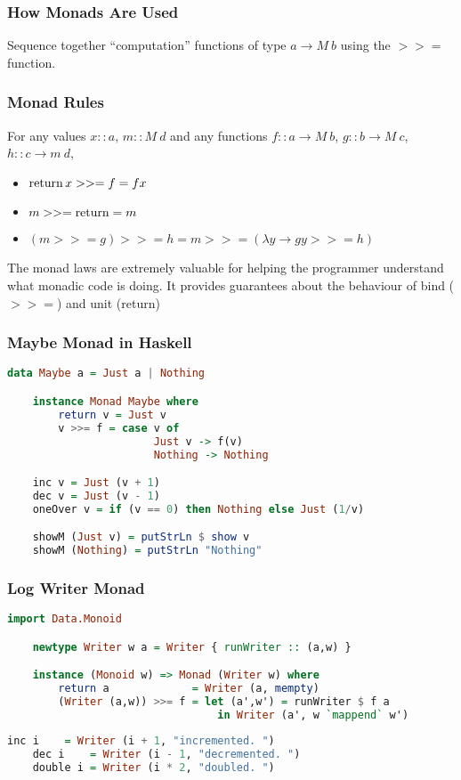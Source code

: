 \documentclass[presentation.tex]{subfiles}
\begin{document}
\begin{frame}
  \frametitle{How Monads Are Used}

  Sequence together ``computation'' functions of type $a \rightarrow
  M\ b$ using the $>>=$ function.
\end{frame}

\begin{frame}
  \frametitle{Monad Rules}
  For any values $x::a$, $m::M\ d$ and any functions $f::a \rightarrow M\ b$, $g::b \rightarrow M\ c$, $h::c \rightarrow m\ d$,
  \begin{itemize}
  \item
    $\operatorname{return} x >>= f = f x$
  \item
    $m >>= \operatorname{return} = m$
  \item
    $(m >>= g) >>= h = m >>= (\lambda y \rightarrow g y >>= h)$
  \end{itemize}

  The monad laws are extremely valuable for helping the programmer
  understand what monadic code is doing. It provides guarantees about
  the behaviour of bind ($>>=$) and unit (return)
\end{frame}


\begin{frame}[fragile]
  \frametitle{Maybe Monad in Haskell}
  \begin{lstlisting}[frame=single,language=Haskell,breaklines=true]
    data Maybe a = Just a | Nothing

    instance Monad Maybe where
        return v = Just v
        v >>= f = case v of
                       Just v -> f(v)
                       Nothing -> Nothing

    inc v = Just (v + 1)
    dec v = Just (v - 1)
    oneOver v = if (v == 0) then Nothing else Just (1/v)

    showM (Just v) = putStrLn $ show v
    showM (Nothing) = putStrLn "Nothing"
  \end{lstlisting}
\end{frame}

\begin{frame}[fragile]
  \frametitle{Log Writer Monad}
  \begin{lstlisting}[frame=single,language=Haskell,breaklines=true]
    import Data.Monoid

    newtype Writer w a = Writer { runWriter :: (a,w) }

    instance (Monoid w) => Monad (Writer w) where
        return a             = Writer (a, mempty)
        (Writer (a,w)) >>= f = let (a',w') = runWriter $ f a
                                 in Writer (a', w `mappend` w')
  \end{lstlisting}
  \pause
  \begin{lstlisting}[frame=single,language=Haskell,breaklines=true]
    inc i    = Writer (i + 1, "incremented. ")
    dec i    = Writer (i - 1, "decremented. ")
    double i = Writer (i * 2, "doubled. ")
  \end{lstlisting}
\end{frame}
\end{document}
